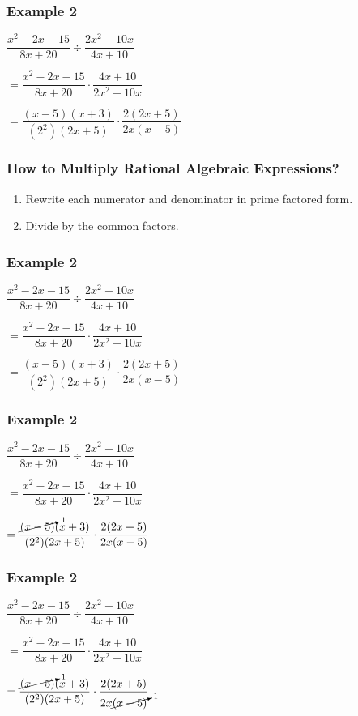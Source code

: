 \documentclass[14pt]{beamer}
\begin{document}
    \begin{frame}
    	\frametitle{Example 2}
    	$\dfrac{x^2 - 2x - 15}{8x + 20} \div \dfrac{2x^2 - 10x}{4x + 10}$ 
    	
    	\vspace{1em}$ =  \dfrac{x^2 - 2x - 15}{8x + 20} \cdot \dfrac{4x + 10}{2x^2 - 10x}$
    	
    	\vspace{1em}$ =  \dfrac{(x-5)(x + 3)}{(2^2) (2x + 5)} \cdot \dfrac{2 (2x + 5)}{ 2x (x  -5)}  $
    \end{frame}

    \begin{frame}
    	\frametitle{How to Multiply Rational Algebraic Expressions?}
    	\begin{enumerate}
    		\item Rewrite each numerator and denominator in prime factored form.
    		\item Divide by the common factors.
    	\end{enumerate}
    \end{frame}

    \begin{frame}
    	\frametitle{Example 2}
    	$\dfrac{x^2 - 2x - 15}{8x + 20} \div \dfrac{2x^2 - 10x}{4x + 10}$ 
    	
    	\vspace{1em}$ =  \dfrac{x^2 - 2x - 15}{8x + 20} \cdot \dfrac{4x + 10}{2x^2 - 10x}$
    	
    	\vspace{1em}$ =  \dfrac{(x-5)(x + 3)}{(2^2) (2x + 5)} \cdot \dfrac{2 (2x + 5)}{ 2x (x  -5)}  $
    \end{frame}

    \begin{frame}
    	\frametitle{Example 2}
    	$\dfrac{x^2 - 2x - 15}{8x + 20} \div \dfrac{2x^2 - 10x}{4x + 10}$ 
    	
    	\vspace{1em}$ =  \dfrac{x^2 - 2x - 15}{8x + 20} \cdot \dfrac{4x + 10}{2x^2 - 10x}$
    	
    	\vspace{1em}$ =  \dfrac{\cancelto{1}{(x-5)}(x + 3)}{(2^2) (2x + 5)} \cdot \dfrac{2 (2x + 5)}{ 2x (x  -5)}  $
    \end{frame}

    \begin{frame}
    	\frametitle{Example 2}
    	$\dfrac{x^2 - 2x - 15}{8x + 20} \div \dfrac{2x^2 - 10x}{4x + 10}$ 
    	
    	\vspace{1em}$ =  \dfrac{x^2 - 2x - 15}{8x + 20} \cdot \dfrac{4x + 10}{2x^2 - 10x}$
    	
    	\vspace{1em}$ =  \dfrac{\cancelto{1}{(x-5)}(x + 3)}{(2^2) (2x + 5)} \cdot \dfrac{2 (2x + 5)}{ 2x \cancelto{1}{(x-5)}}  $
    \end{frame}
\end{document}
